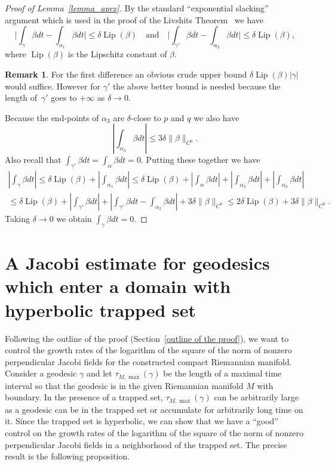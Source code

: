 \documentclass[JEP,XML,SOM,Unicode,NoFloatCountersInSection]{cedram}
\DeclareMathOperator{\Lip}{Lip}
\theoremstyle{definition}
\newtheorem{remark}[theorem]{Remark}
\renewcommand{\>}{{\rangle}}
\newcommand{\<}{{\langle}}
\begin{document}
\begin{proof}[Proof of Lemma~\ref{lemma_aprx}]
By the standard ``exponential slacking'' argument which is used in the proof of the Livshits Theorem~\cite{L71} we have
\[
\biggl|\int_\gamma\beta dt-\int_{\alpha_1}\beta dt \biggr|\le\delta \Lip(\beta)
\quad
\text{and}
\quad
\biggl|\int_{\gamma'}\beta dt-\int_{\alpha_2}\beta dt \biggl|\le\delta \Lip(\beta),
\]
where $\Lip(\beta)$ is the Lipschitz constant of $\beta$.
\begin{remark} For the first difference an obvious crude upper bound $\delta \Lip(\beta)|\gamma|$ would suffice. However for $\gamma'$ the above better bound is needed because the length of~$\gamma'$ goes to $+\infty$ as $\delta\to 0$.
\end{remark}
Because the end-points of $\alpha_3$ are $\delta$-close to $p$ and $q$ we also have
\[
\left|\int_{\alpha_3}\beta dt \right|\le 3\delta\|\beta\|_{C^0}.
\]
Also recall that $\int_{\gamma'}\beta dt=\int_{\alpha}\beta dt=0$. Putting these together we have
\begin{multline*}
\left|\int_{\gamma}\beta dt \right|\le\delta \Lip(\beta)+\left|\int_{\alpha_1}\beta dt \right| \le \delta \Lip(\beta)+\left|\int_{\alpha}\beta dt \right| +\left|\int_{\alpha_2}\beta dt \right| +\left|\int_{\alpha_3}\beta dt \right| \\
\le \delta \Lip(\beta)+\left|\int_{\gamma'}\beta dt \right|+\left|\int_{\gamma'}\beta dt-\int_{\alpha_2}\beta dt \right|+3\delta\|\beta\|_{C^0}\le 2\delta \Lip(\beta)+3\delta\|\beta\|_{C^0}.
\end{multline*}
Taking $\delta\to 0$ we obtain $\int_\gamma\beta dt=0$.
\end{proof}

\section{A Jacobi estimate for geodesics which enter a domain with hyperbolic trapped set}\label{sec: mu_estimate_domain}

Following the outline of the proof (Section~\ref{outline of the proof}), we want to control the growth rates of the logarithm of the square of the norm of nonzero perpendicular Jacobi fields for the constructed compact Riemannian manifold. Consider a geodesic $\gamma$ and let $\tau_{M,\max}(\gamma)$ be the length of a maximal time interval so that the geodesic is in the given Riemannian manifold $M$ with boundary. In the presence of a trapped set, $\tau_{M,\max}(\gamma)$ can be arbitrarily large as a geodesic can be in the trapped set or accumulate for arbitrarily long time on it. Since the trapped set is hyperbolic, we can show that we have a ``good'' control on the growth rates of the logarithm of the square of the norm of nonzero perpendicular Jacobi fields in a neighborhood of the trapped set. The precise result is the following proposition.
\end{document}
